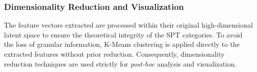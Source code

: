 


\subsubsection{Dimensionality Reduction and Visualization}





The feature vectors extracted are processed within their original high-dimensional latent space to ensure the theoretical integrity of the SPT categories. To avoid the loss of granular information, K-Means clustering is applied directly to the extracted features without prior reduction. Consequently, dimensionality reduction techniques are used strictly for \textit{post-hoc} analysis and visualization.

